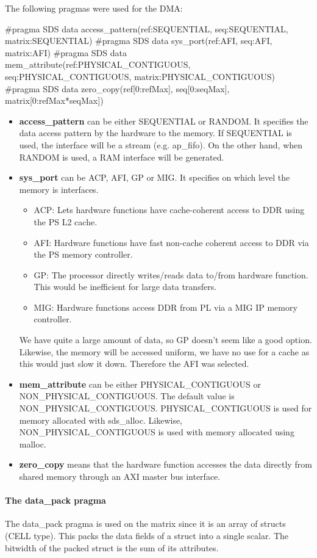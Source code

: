 The following pragmas were used for the DMA:
\begin{lcverbatim}
#pragma SDS data access_pattern(ref:SEQUENTIAL, seq:SEQUENTIAL, 
	matrix:SEQUENTIAL)
#pragma SDS data sys_port(ref:AFI, seq:AFI, matrix:AFI)
#pragma SDS data mem_attribute(ref:PHYSICAL_CONTIGUOUS, 
	seq:PHYSICAL_CONTIGUOUS, matrix:PHYSICAL_CONTIGUOUS)
#pragma SDS data zero_copy(ref[0:refMax], seq[0:seqMax], 
	matrix[0:refMax*seqMax])
\end{lcverbatim}
\begin{itemize}
	\item \textbf{access\_pattern} can be either SEQUENTIAL or RANDOM. It specifies the data access pattern by the hardware to the memory. If SEQUENTIAL is used, the interface will be a stream (e.g. ap\_fifo). On the other hand, when RANDOM is used, a RAM interface will be generated.
	\item \textbf{sys\_port} can be ACP, AFI, GP or MIG. It specifies on which level the memory is interfaces. 
	\begin{itemize}
		\item ACP: Lets hardware functions have cache-coherent access to DDR using the PS L2 cache.
		\item AFI: Hardware functions have fast non-cache coherent access to DDR via the PS memory controller.
		\item GP: The processor directly writes/reads data to/from hardware function. This would be inefficient for large data transfers.
		\item MIG: Hardware functions access DDR from PL via a MIG IP memory controller.
	\end{itemize}
	We have quite a large amount of data, so GP doesn't seem like a good option. Likewise, the memory will be accessed uniform, we have no use for a cache as this would just slow it down. Therefore the AFI was selected.
	\item \textbf{mem\_attribute} can be either PHYSICAL\_CONTIGUOUS or NON\_PHYSICAL\_CONTIGUOUS. The default value is NON\_PHYSICAL\_CONTIGUOUS. PHYSICAL\_CONTIGUOUS is used for memory allocated with sds\_alloc. Likewise, NON\_PHYSICAL\_CONTIGUOUS is used with memory allocated using malloc.
	\item \textbf{zero\_copy} means that the hardware function accesses the data directly from shared memory through an AXI master bus interface.
\end{itemize}

\paragraph{The data\_pack pragma} The data\_pack pragma is used on the matrix since it is an array of structs (CELL type). This packs the data fields of a struct into a single scalar. The bitwidth of the packed struct is the sum of its attributes.

